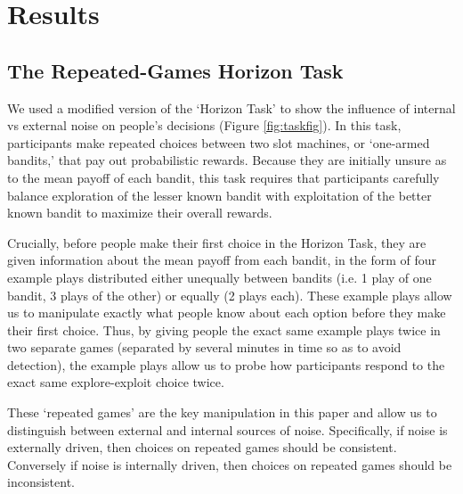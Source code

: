 \documentclass[12pt]{article}
\begin{document}
	
	
	
	
	\section*{Results}
	
	\subsection*{The Repeated-Games Horizon Task}
	We used a modified version of the `Horizon Task' \citep{wilson2014} to show the influence of internal vs external noise on people's decisions (Figure \ref{fig:taskfig}). In this task, participants make repeated choices between two slot machines, or `one-armed bandits,' that pay out probabilistic rewards. Because they are initially unsure as to the mean payoff of each bandit, this task requires that participants carefully balance exploration of the lesser known bandit with exploitation of the better known bandit to maximize their overall rewards. 
	
	Crucially, before people make their first choice in the Horizon Task, they are given information about the mean payoff from each bandit, in the form of four example plays distributed either unequally between bandits (i.e. 1 play of one bandit, 3 plays of the other) or equally (2 plays each). These example plays allow us to manipulate exactly what people know about each option before they make their first choice. Thus, by giving people the exact same example plays twice in two separate games (separated by several minutes in time so as to avoid detection), the example plays allow us to probe how participants respond to the exact same explore-exploit choice twice.  
	
	These `repeated games' are the key manipulation in this paper and allow us to distinguish between external and internal sources of noise.  Specifically, if noise is externally driven, then choices on repeated games should be consistent. Conversely if noise is internally driven, then choices on repeated games should be inconsistent.
	
\end{document}
